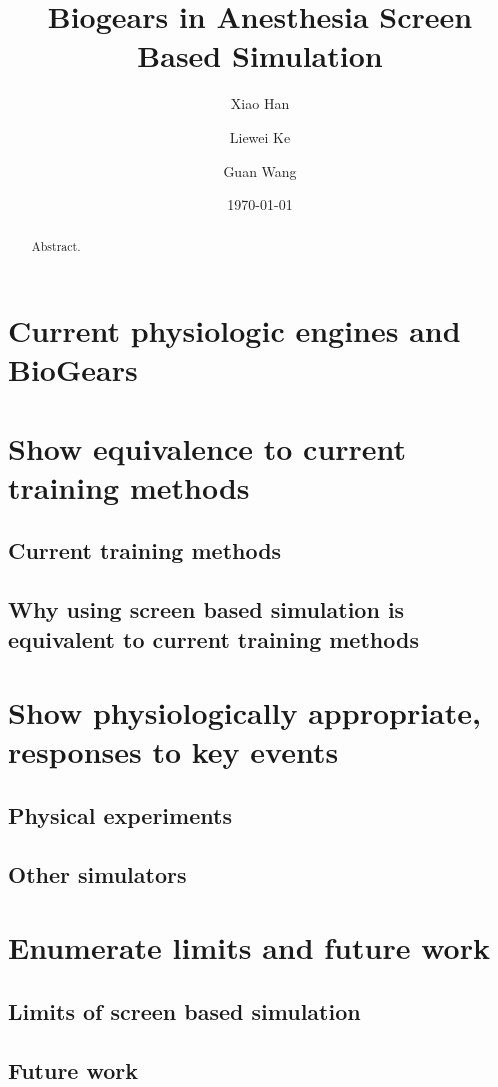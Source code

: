 \documentclass[a4paper]{article}
\title{Biogears in Anesthesia Screen Based Simulation}
\author{
  Xiao Han\\
  \and Liewei Ke
  \and Guan Wang
}
\date{\today}
\begin{document}
\maketitle

\begin{abstract}
Abstract.
\end{abstract}

\section{Current physiologic engines and BioGears}

\section{Show equivalence to current training methods}
\subsection{Current training methods}
\subsection{Why using screen based simulation is equivalent to current training methods}

\section{Show physiologically appropriate, responses to key events}
\subsection{Physical experiments}
\subsection{Other simulators}

\section{Enumerate limits and future work}
\subsection{Limits of screen based simulation}
\subsection{Future work}
\end{document}
